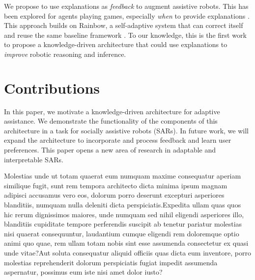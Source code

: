 \documentclass[letterpaper]{article} %
\begin{document}
We propose to use explanations as \emph{feedback} to augment assistive
robots.  This has been explored for agents playing games, especially
\emph{when} to provide explanations \cite{li2020reasoning}.  This approach
builds on Rainbow, a self-adaptive system that can correct itself and
reuse the same baseline framework \cite{rainbow}.  To our knowledge,
this is the first work to propose a knowledge-driven architecture that could use explanations to \emph{improve} robotic reasoning and inference.
\section{Contributions}

In this paper, we motivate a knowledge-driven architecture for adaptive assistance. We demonstrate the functionality of the components of this architecture in a task for socially assistive robots (SARs). In future work, we will expand the architecture to incorporate and process feedback and learn user preferences. This paper opens a new area of research in adaptable and interpretable SARs.


Molestias unde ut totam quaerat eum numquam maxime consequatur aperiam similique fugit, sunt rem tempora architecto dicta minima ipsum magnam adipisci accusamus vero eos, dolorum porro deserunt excepturi asperiores blanditiis, numquam nulla deleniti dicta perspiciatis.Expedita ullam quas quos hic rerum dignissimos maiores, unde numquam sed nihil eligendi asperiores illo, blanditiis cupiditate tempore perferendis suscipit ab tenetur pariatur molestias nisi quaerat consequuntur, laudantium cumque eligendi rem doloremque optio animi quo quae, rem ullam totam nobis sint esse assumenda consectetur ex quasi unde vitae?Aut soluta consequatur aliquid officiis quas dicta eum inventore, porro molestias reprehenderit dolorum perspiciatis fugiat impedit assumenda aspernatur, possimus eum iste nisi amet dolor iusto?\clearpage

\end{document}
